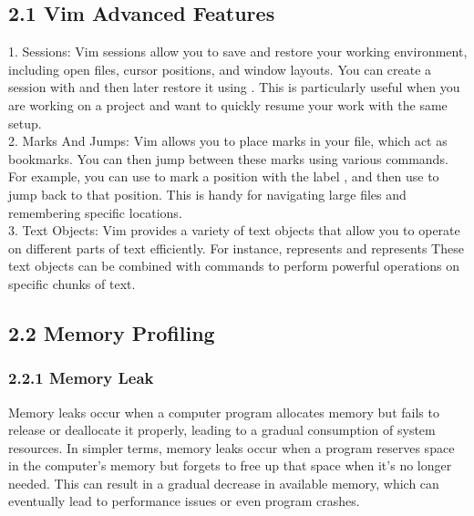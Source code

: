 \documentclass{article}
\begin{document}
\subsection*{\Large 2.1 Vim Advanced Features}
1. Sessions:
Vim sessions allow you to save and restore your working environment, including open files, cursor positions, and window layouts. You can create a session with  and then later restore it using . This is particularly useful when you are working on a project and want to quickly resume your work with the same setup.\\
2. Marks And Jumps:
Vim allows you to place marks in your file, which act as bookmarks. You can then jump between these marks using various commands. For example, you can use  to mark a position with the label , and then use  to jump back to that position. This is handy for navigating large files and remembering specific locations.\\
3. Text Objects:
Vim provides a variety of text objects that allow you to operate on different parts of text efficiently. For instance,  represents  and  represents  These text objects can be combined with commands to perform powerful operations on specific chunks of text.\\
\subsection*{\Large 2.2 Memory Profiling}
\subsubsection*{\large 2.2.1 Memory Leak}
Memory leaks occur when a computer program allocates memory but fails to release or deallocate it properly, leading to a gradual consumption of system resources. In simpler terms, memory leaks occur when a program reserves space in the computer's memory but forgets to free up that space when it's no longer needed. This can result in a gradual decrease in available memory, which can eventually lead to performance issues or even program crashes.
\end{document}
